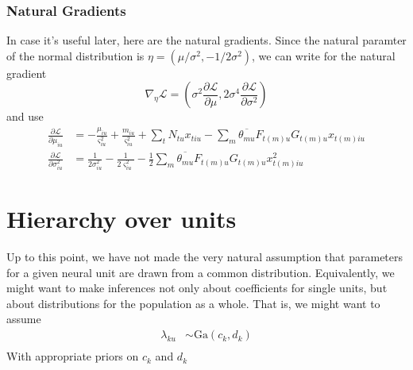 \documentclass[11pt]{article}
\begin{document}
\subsubsection{Natural Gradients}
In case it's useful later, here are the natural gradients. Since the natural paramter of the normal distribution is $\eta = (\mu/\sigma^2, -1/2\sigma^2)$, we can write for the natural gradient
\begin{equation}
    \nabla_\eta \mathcal{L} = \left( \sigma^2 \frac{\partial \mathcal{L}}{\partial \mu}, 2\sigma^4 \frac{\partial \mathcal{L}}{\partial \sigma^2}\right)
\end{equation}
and use
\begin{align}
    \frac{\partial \mathcal{L}}{\partial \mu_{iu}} &= 
    -\frac{\mu_{iu}}{\varsigma^2_{iu}} + \frac{m_{iu}}{\varsigma^2_{iu}} + \sum_t N_{tu} x_{tiu} - \sum_{m} \overline{\theta_{mu}} F_{t(m)u} G_{t(m)u} x_{t(m)iu} \\
    \frac{\partial \mathcal{L}}{\partial \sigma^2_{iu}} &= 
    \frac{1}{2\sigma^2_{iu}} - \frac{1}{2\varsigma^2_{iu}} - \frac{1}{2} \sum_{m} \overline{\theta_{mu}} F_{t(m)u} G_{t(m)u} x^2_{t(m)iu}
\end{align}

\section{Hierarchy over units}
Up to this point, we have not made the very natural assumption that parameters for a given neural unit are drawn from a common distribution. Equivalently, we might want to make inferences not only about coefficients for single units, but about distributions for the population as a whole. That is, we might want to assume
\begin{align}
    \lambda_{ku} &\sim \mathrm{Ga}(c_k, d_k) \\
\end{align}
With appropriate priors on $c_k$ and $d_k$
\end{document}
